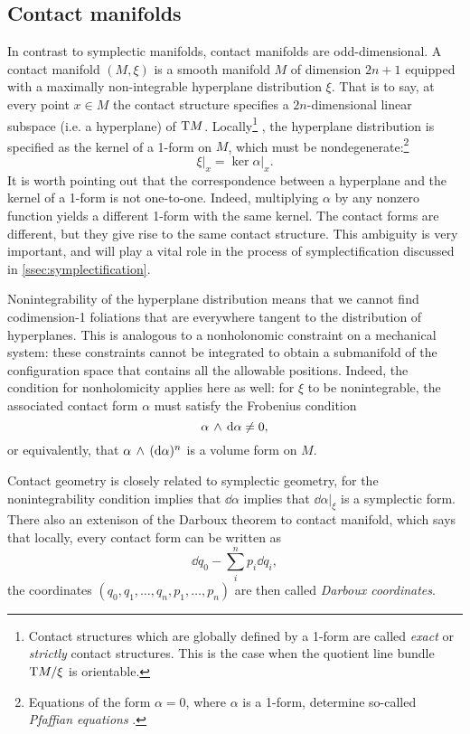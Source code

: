 \subsection{Contact manifolds}
In contrast to symplectic manifolds, contact manifolds are odd-dimensional. A contact manifold \((M, \xi)\) is a smooth manifold \(M\) of dimension \(2n + 1\) equipped with a maximally non-integrable hyperplane distribution \(\xi\). That is to say, at every point \(x \in M\) the contact structure specifies a \(2n\)-dimensional linear subspace (i.e. a hyperplane) of \(\mathrm{T}M\). Locally\footnote
{
    Contact structures which are globally defined by a 1-form are called \emph{exact} or \emph{strictly} contact structures. This is the case when the quotient line bundle \( \mathrm{T}M/\xi\) is orientable. 
}
, the hyperplane distribution is specified as the kernel of a 1-form on \(M\), which must be nondegenerate:\footnote{Equations of the form \( \alpha = 0\), where \(\alpha\) is a 1-form, determine so-called \emph{Pfaffian equations} \cite{Libermann1987}.} \cite{Geiges2008, Arnold1989, Cannas2001}
\begin{equation}
     \xi\vert_x = \ker{\alpha}\vert_x.
\end{equation}
It is worth pointing out that the correspondence between a hyperplane and the kernel of a 1-form is not one-to-one. Indeed, multiplying \(\alpha\) by any nonzero function yields a different 1-form with the same kernel. The contact forms are different, but they give rise to the same contact structure. This ambiguity is very important, and will play a vital role in the process of symplectification discussed in \cref{ssec:symplectification}.

Nonintegrability of the hyperplane distribution means that we cannot find codimension-1 foliations that are everywhere tangent to the distribution of hyperplanes. This is analogous to a nonholonomic constraint on a mechanical system: these constraints cannot be integrated to obtain a submanifold of the configuration space that contains all the allowable positions. Indeed, the condition for nonholomicity applies here as well: for \(\xi\) to be nonintegrable, the associated contact form \(\alpha\) must satisfy the Frobenius condition 
\begin{equation}
      \alpha\,\wedge\,\dd{\alpha}  \neq 0,
\end{equation}
or equivalently, that \( \alpha\,\wedge\,(\dd{\alpha})^n \) is a volume form on \(M\). 

Contact geometry is closely related to symplectic geometry, for the nonintegrability condition implies that \(\dd{\alpha}\) implies that \(\dd{\alpha}\vert_{\xi}\) is a symplectic form. There also an extenison of the Darboux theorem to contact manifold, which says that locally, every contact form can be written as
\begin{equation}
    \dd{q}_0 - \sum_i^n p_i \dd{q}_i, 
    \label{eq:contact_darboux}
\end{equation} 
the coordinates \((q_0, q_1, \ldots, q_n, p_1, \ldots, p_n)\) are then called \emph{Darboux coordinates}.

